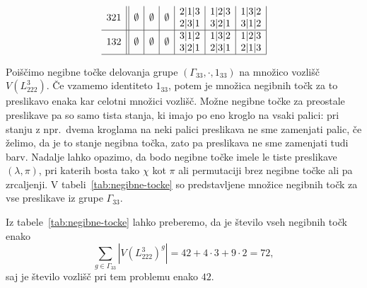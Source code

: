 \documentclass[12pt,a4paper]{amsart}
\theoremstyle{definition} %
\theoremstyle{plain} %
\begin{document}
\begin{table}[h]
\[\begin{array}{c||c|c|c|c|c|c|}
        321 & \emptyset & \emptyset & \emptyset & \begin{tabular}{@{}c@{}}2|1|3 \\ 2|3|1 \end{tabular} & \begin{tabular}{@{}c@{}}1|2|3 \\ 3|2|1 \end{tabular} & \begin{tabular}{@{}c@{}}1|3|2 \\ 3|1|2 \end{tabular} \\ \hline
        132 & \emptyset & \emptyset & \emptyset & \begin{tabular}{@{}c@{}}3|1|2 \\ 3|2|1 \end{tabular} & \begin{tabular}{@{}c@{}}1|3|2 \\ 2|3|1 \end{tabular} & \begin{tabular}{@{}c@{}}1|2|3 \\ 2|1|3 \end{tabular} \\ \hline
        \end{array}
        \]
        \medskip
        \label{tab:negibne-tocke}
    \end{table}
    
    Poiščimo negibne točke delovanja grupe $ (\Gamma_{33}, \cdot,1_{33} ) $ na množico vozlišč $V(L_{222}^3)$. Če vzamemo identiteto $1_{33}$, potem je množica negibnih točk za to preslikavo enaka kar celotni množici vozlišč. 
    Možne negibne točke za preostale preslikave pa so samo tista stanja, ki imajo po eno kroglo na vsaki palici: pri stanju z npr.\ dvema kroglama na neki palici preslikava ne sme zamenjati palic, če želimo, da je to stanje negibna točka, zato pa preslikava ne sme zamenjati tudi barv.
    Nadalje lahko opazimo, da bodo negibne točke imele le tiste preslikave $(\lambda, \pi)$, pri katerih bosta tako $\chi$ kot $\pi$ ali permutaciji brez negibne točke ali pa zrcaljenji. V tabeli~\ref{tab:negibne-tocke} so predstavljene množice negibnih točk za vse preslikave iz grupe $\Gamma_{33}$.
    
    Iz tabele~\ref{tab:negibne-tocke} lahko preberemo, da je število vseh negibnih točk enako
    \[ \sum_{g \in \Gamma_{33}} |V(L^3_{222})^g| = 42 + 4 \cdot 3 + 9 \cdot 2 = 72, \]
    saj je število vozlišč pri tem problemu enako $42$.
    
\end{document}
